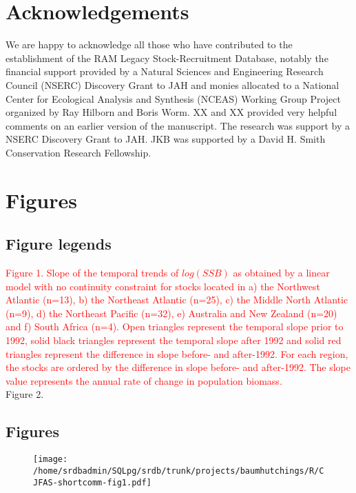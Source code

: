 \documentclass[letterpaper,12pt]{article}
\begin{document}
\section*{Acknowledgements} 
We are happy to acknowledge all those who
have contributed to the establishment of the RAM Legacy
Stock-Recruitment Database, notably the financial support provided by
a Natural Sciences and Engineering Research Council (NSERC) Discovery
Grant to JAH and monies allocated to a National Center for Ecological
Analysis and Synthesis (NCEAS) Working Group Project organized by Ray
Hilborn and Boris Worm. XX and XX provided very helpful comments on an
earlier version of the manuscript. The research was support by a NSERC
Discovery Grant to JAH. JKB was supported by a David H. Smith
Conservation Research Fellowship.

% 
 



\section*{Figures}
\subsection*{Figure legends}
\textcolor{red}{
\noindent Figure 1. Slope of the temporal trends of $log(SSB)$ as obtained by a linear model with no continuity constraint for stocks located in a) the Northwest Atlantic (n=13), b) the Northeast Atlantic (n=25), c) the Middle North Atlantic (n=9), d) the Northeast Pacific (n=32), e) Australia and New Zealand (n=20) and f) South Africa (n=4). Open triangles represent the temporal slope prior to 1992, solid black triangles represent the temporal slope after 1992 and solid red triangles represent the difference in slope before- and after-1992. For each region, the stocks are ordered by the difference in slope before- and after-1992. The slope value represents the annual rate of change in population biomass.}\\

\noindent Figure 2. \\

\subsection*{Figures}

\begin{figure}\label{fig1}
\begin{center}
\texttt{[image: /home/srdbadmin/SQLpg/srdb/trunk/projects/baumhutchings/R/CJFAS-shortcomm-fig1.pdf]}
\end{center}
\caption{}
\end{figure}
\end{document}
